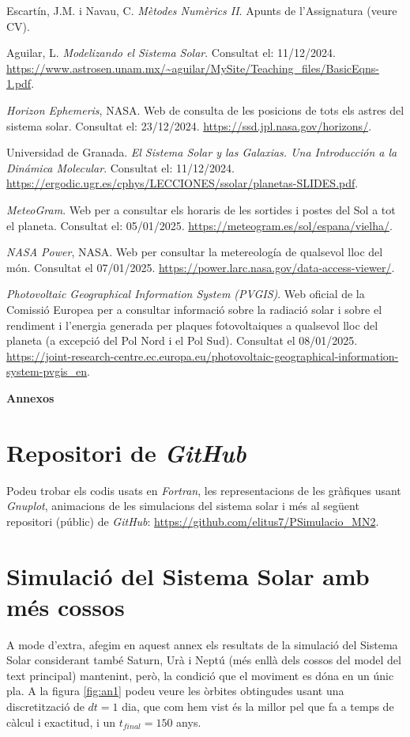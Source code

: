 \documentclass[10pt, twoside, a4paper]{article}
\begin{document}
\newpage
\begin{thebibliography}{99}
    Escartín, J.M. i Navau, C. \textit{Mètodes Numèrics II}. Apunts de l'Assignatura (veure CV).

    Aguilar, L. \textit{Modelizando el Sistema Solar}. Consultat el: 11/12/2024. \url{https://www.astrosen.unam.mx/~aguilar/MySite/Teaching_files/BasicEqns-1.pdf}.

    \textit{Horizon Ephemeris}, NASA. Web de consulta de les posicions de tots els astres del sistema solar. Consultat el: 23/12/2024. \url{https://ssd.jpl.nasa.gov/horizons/}.

    Universidad de Granada. \textit{El Sistema Solar y las Galaxias. Una Introducción a la Dinámica Molecular}. Consultat el: 11/12/2024. \url{https://ergodic.ugr.es/cphys/LECCIONES/ssolar/planetas-SLIDES.pdf}.

    \textit{MeteoGram}. Web per a consultar els horaris de les sortides i postes del Sol a tot el planeta. Consultat el: 05/01/2025. \url{https://meteogram.es/sol/espana/vielha/}.

    \textit{NASA Power}, NASA. Web per consultar la metereología de qualsevol lloc del món. Consultat el 07/01/2025. \url{https://power.larc.nasa.gov/data-access-viewer/}.

    \textit{Photovoltaic Geographical Information System (PVGIS)}. Web oficial de la Comissió Europea per a consultar informació sobre la radiació solar i sobre el rendiment i l'energia generada per plaques fotovoltaiques a qualsevol lloc del planeta (a excepció del Pol Nord i el Pol Sud). Consultat el 08/01/2025. \url{https://joint-research-centre.ec.europa.eu/photovoltaic-geographical-information-system-pvgis_en}.

    
\end{thebibliography}

\newpage
\appendix
{\Huge{\textbf{Annexos}}}
\section{Repositori de \textit{GitHub}}
\label{an:a}
Podeu trobar els codis usats en \textit{Fortran}, les representacions de les gràfiques usant \textit{Gnuplot}, animacions de les simulacions del sistema solar i més al següent repositori (públic) de \textit{GitHub}: \url{https://github.com/elitus7/PSimulacio_MN2}.

\section{Simulació del Sistema Solar amb més cossos}
\label{an:b}
A mode d'extra, afegim en aquest annex els resultats de la simulació del Sistema Solar considerant també Saturn, Urà i Neptú (més enllà dels cossos del model del text principal) mantenint, però, la condició que el moviment es dóna en un únic pla. A la figura \ref{fig:an1} podeu veure les òrbites obtingudes usant una discretització de $dt=1$ dia, que com hem vist és la millor pel que fa a temps de càlcul i exactitud, i un $t_{final}=150$ anys.
\end{document}
